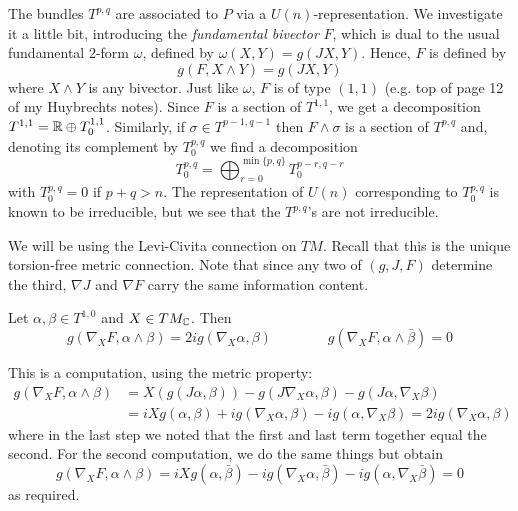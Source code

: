 \documentclass{scrartcl}
\begin{document}
\medskip

The bundles $T^{p,q}$ are associated to $P$ via a $U(n)$-representation. We investigate it a little bit, introducing the \emph{fundamental bivector} $F$, which is dual to the usual fundamental 2-form $\omega$, defined by $\omega(X,Y)=g(JX,Y)$. Hence, $F$ is defined by
\begin{equation*}
g(F,X\wedge Y)=g(JX,Y)
\end{equation*}
where $X\wedge Y$ is any bivector. Just like $\omega$, $F$ is of type $(1,1)$ (e.g. top of page 12 of my Huybrechts notes). Since $F$ is a section of $T^{1,1}$, we get a decomposition $T^{1,1}=\mathbb{R}\oplus T^{1,1}_0$.
Similarly, if $\sigma\in T^{p-1,q-1}$ then $F\wedge\sigma$ is a section of $T^{p,q}$ and, denoting its complement by $T^{p,q}_0$ we find a decomposition 
\begin{equation*}
T^{p,q}_0=\bigoplus_{r=0}^{\min\{p,q\}}T^{p-r,q-r}_0 
\end{equation*}
with $T^{p,q}_0=0$ if $p+q>n$. The representation of $U(n)$ corresponding to $T^{p,q}_0$ is known to be irreducible, but we see that the $T^{p,q}$'s are not irreducible.

\medskip

We will be using the Levi-Civita connection on $TM$. Recall that this is the unique torsion-free metric connection. Note that since any two of $(g,J,F)$ determine the third, $\nabla J$ and $\nabla F$ carry the same information content. 

\begin{lem}
	Let $\alpha,\beta\in T^{1,0}$ and $X\in TM_{\mathbb{C}}$. Then 
	\begin{equation*}
	g(\nabla_X F,\alpha\wedge\beta)=2ig(\nabla_X\alpha,\beta) \qquad \qquad 
	g(\nabla_X F,\alpha\wedge\bar\beta)=0
	\end{equation*}
\end{lem}
\begin{myproof}
	This is a computation, using the metric property:
	\begin{align*}
	g(\nabla_X F,\alpha\wedge\beta)
	&=X(g(J\alpha,\beta))-g(J\nabla_X \alpha,\beta)-g(J\alpha,\nabla_X\beta)\\
	&=iXg(\alpha,\beta)+ig(\nabla_X \alpha,\beta)-ig(\alpha,\nabla_X\beta)
	=2ig(\nabla_X\alpha,\beta)
	\end{align*}
	where in the last step we noted that the first and last term together equal the second. For the second computation, we do the same things but obtain
	\begin{equation*}
	g(\nabla_X F,\alpha\wedge\beta)
	=iXg(\alpha,\bar\beta)-ig(\nabla_X \alpha,\bar\beta)
	-ig(\alpha,\nabla_X\bar\beta)=0
	\end{equation*}
	as required.
\end{myproof}
\end{document}
